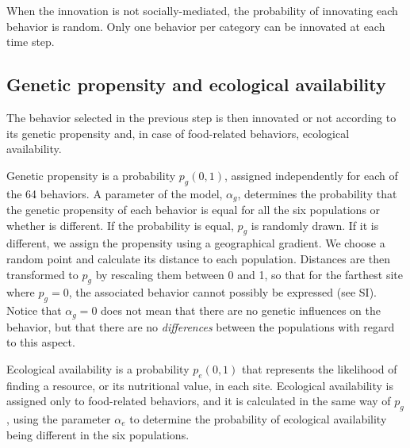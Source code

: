 \documentclass[9pt,twocolumn,twoside,]{pnas-new}
\begin{document}
When the innovation is not socially-mediated, the probability of
innovating each behavior is random. Only one behavior per category can
be innovated at each time step.

\hypertarget{format}{%
\subsection*{Genetic propensity and ecological
availability}\label{format}}

The behavior selected in the previous step is then innovated or not
according to its genetic propensity and, in case of food-related
behaviors, ecological availability.

Genetic propensity is a probability \(p_g(0,1)\), assigned independently
for each of the 64 behaviors. A parameter of the model, \(\alpha_g\),
determines the probability that the genetic propensity of each behavior
is equal for all the six populations or whether is different. If the
probability is equal, \(p_g\) is randomly drawn. If it is different, we
assign the propensity using a geographical gradient. We choose a random
point and calculate its distance to each population. Distances are then
transformed to \(p_g\) by rescaling them between 0 and 1, so that for
the farthest site where \(p_g=0\), the associated behavior cannot
possibly be expressed (see SI). Notice that \(\alpha_g=0\) does not mean
that there are no genetic influences on the behavior, but that there are
no \emph{differences} between the populations with regard to this
aspect.

Ecological availability is a probability \(p_e(0,1)\) that represents
the likelihood of finding a resource, or its nutritional value, in each
site. Ecological availability is assigned only to food-related
behaviors, and it is calculated in the same way of \(p_g\), using the
parameter \(\alpha_e\) to determine the probability of ecological
availability being different in the six populations.
\end{document}
